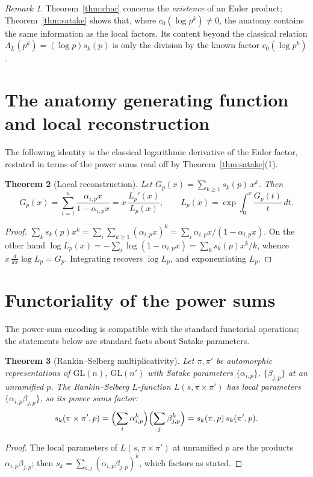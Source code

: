\documentclass[11pt]{amsart}
\newtheorem{theorem}{Theorem}[section]
\theoremstyle{definition}
\theoremstyle{remark}
\newtheorem{remark}[theorem]{Remark}
\newcommand{\GL}{\mathrm{GL}}
\begin{document}
\begin{remark}
Theorem~\ref{thm:char} concerns the \emph{existence} of an Euler product;
Theorem~\ref{thm:satake} shows that, where $c_0(\log p^k)\ne0$, the anatomy
contains the same information as the local factors. Its content beyond the
classical relation $\Lambda_L(p^k)=(\log p)s_k(p)$ is only the division by the
known factor $c_0(\log p^k)$.
\end{remark}

\section{The anatomy generating function and local reconstruction}\label{sec:gen}
The following identity is the classical logarithmic derivative of the Euler
factor, restated in terms of the power sums read off by
Theorem~\ref{thm:satake}(1).
\begin{theorem}[Local reconstruction]\label{thm:gen}
Let $G_p(x)=\sum_{k\ge1}s_k(p)\,x^k$. Then
\[
G_p(x)=\sum_{i=1}^n\frac{\alpha_{i,p}x}{1-\alpha_{i,p}x}=x\,\frac{L_p'(x)}{L_p(x)},
\qquad
L_p(x)=\exp\!\int_0^x\frac{G_p(t)}{t}\,dt .
\]
\end{theorem}
\begin{proof}
$\sum_k s_k(p)x^k=\sum_i\sum_{k\ge1}(\alpha_{i,p}x)^k=\sum_i\alpha_{i,p}x/
(1-\alpha_{i,p}x)$. On the other hand $\log L_p(x)=-\sum_i\log(1-\alpha_{i,p}x)
=\sum_k s_k(p)x^k/k$, whence $x\,\tfrac{d}{dx}\log L_p=G_p$. Integrating recovers
$\log L_p$, and exponentiating $L_p$.
\end{proof}

\section{Functoriality of the power sums}\label{sec:funct}
The power-sum encoding is compatible with the standard functorial operations;
the statements below are standard facts about Satake parameters.

\begin{theorem}[Rankin--Selberg multiplicativity]\label{thm:rs}
Let $\pi,\pi'$ be automorphic representations of $\GL(n)$, $\GL(n')$ with Satake
parameters $\{\alpha_{i,p}\}$, $\{\beta_{j,p}\}$ at an unramified $p$. The
Rankin--Selberg $L$-function $L(s,\pi\times\pi')$ has local parameters
$\{\alpha_{i,p}\beta_{j,p}\}$, so its power sums factor:
\[
s_k(\pi\times\pi',p)=\Bigl(\sum_i\alpha_{i,p}^k\Bigr)\Bigl(\sum_j\beta_{j,p}^k\Bigr)
=s_k(\pi,p)\,s_k(\pi',p).
\]
\end{theorem}
\begin{proof}
The local parameters of $L(s,\pi\times\pi')$ at unramified $p$ are the
products $\alpha_{i,p}\beta_{j,p}$; then
$s_k=\sum_{i,j}(\alpha_{i,p}\beta_{j,p})^k$, which factors as stated.
\end{proof}
\end{document}
